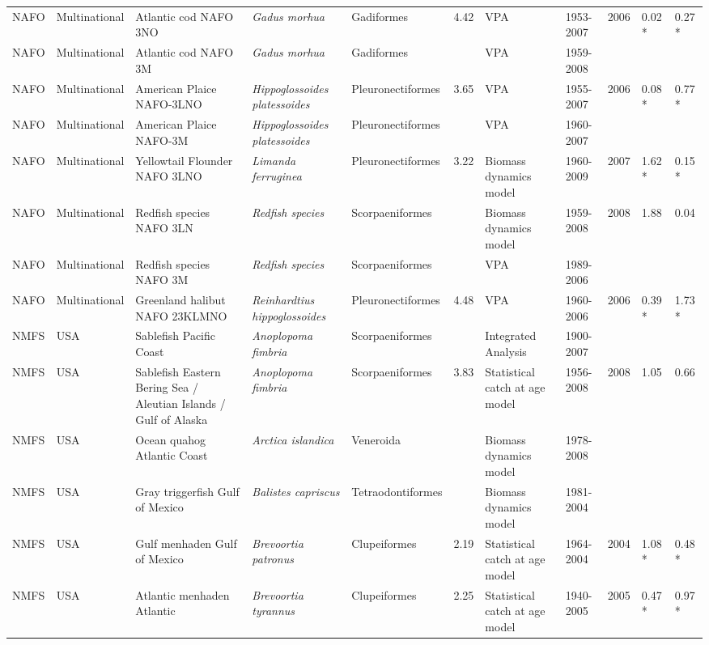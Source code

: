 \begin{longtable}{p{1.5cm}p{1.5cm}p{3cm}p{3cm}p{2.5cm}p{0.9cm}p{1.4cm}p{0.9cm}p{0.9cm}p{0.9cm}p{1cm}}
  NAFO & Multinational & Atlantic cod NAFO 3NO & \textit{Gadus morhua} & Gadiformes & 4.42 & VPA & 1953-2007 & 2006 & 0.02 * & 0.27 * \\ 
  NAFO & Multinational & Atlantic cod NAFO 3M & \textit{Gadus morhua} & Gadiformes &  & VPA & 1959-2008 &  &  &  \\ 
  NAFO & Multinational & American Plaice NAFO-3LNO & \textit{Hippoglossoides platessoides} & Pleuronectiformes & 3.65 & VPA & 1955-2007 & 2006 & 0.08 * & 0.77 * \\ 
  NAFO & Multinational & American Plaice NAFO-3M & \textit{Hippoglossoides platessoides} & Pleuronectiformes &  & VPA & 1960-2007 &  &  &  \\ 
  NAFO & Multinational & Yellowtail Flounder NAFO 3LNO & \textit{Limanda ferruginea} & Pleuronectiformes & 3.22 & Biomass dynamics model & 1960-2009 & 2007 & 1.62 * & 0.15 * \\ 
  NAFO & Multinational & Redfish species NAFO 3LN & \textit{Redfish species} & Scorpaeniformes &  & Biomass dynamics model & 1959-2008 & 2008 & 1.88 & 0.04 \\ 
  NAFO & Multinational & Redfish species NAFO 3M & \textit{Redfish species} & Scorpaeniformes &  & VPA & 1989-2006 &  &  &  \\ 
  NAFO & Multinational & Greenland halibut NAFO 23KLMNO & \textit{Reinhardtius hippoglossoides} & Pleuronectiformes & 4.48 & VPA & 1960-2006 & 2006 & 0.39 * & 1.73 * \\ 
  NMFS & USA & Sablefish Pacific Coast & \textit{Anoplopoma fimbria} & Scorpaeniformes &  & Integrated Analysis & 1900-2007 &  &  &  \\ 
  NMFS & USA & Sablefish Eastern Bering Sea / Aleutian Islands / Gulf of Alaska & \textit{Anoplopoma fimbria} & Scorpaeniformes & 3.83 & Statistical catch at age model & 1956-2008 & 2008 & 1.05 & 0.66 \\ 
  NMFS & USA & Ocean quahog Atlantic Coast & \textit{Arctica islandica} & Veneroida &  & Biomass dynamics model & 1978-2008 &  &  &  \\ 
  NMFS & USA & Gray triggerfish Gulf of Mexico & \textit{Balistes capriscus} & Tetraodontiformes &  & Biomass dynamics model & 1981-2004 &  &  &  \\ 
  NMFS & USA & Gulf menhaden Gulf of Mexico & \textit{Brevoortia patronus} & Clupeiformes & 2.19 & Statistical catch at age model & 1964-2004 & 2004 & 1.08 * & 0.48 * \\ 
  NMFS & USA & Atlantic menhaden Atlantic & \textit{Brevoortia tyrannus} & Clupeiformes & 2.25 & Statistical catch at age model & 1940-2005 & 2005 & 0.47 * & 0.97 * \\ 

\end{longtable}
